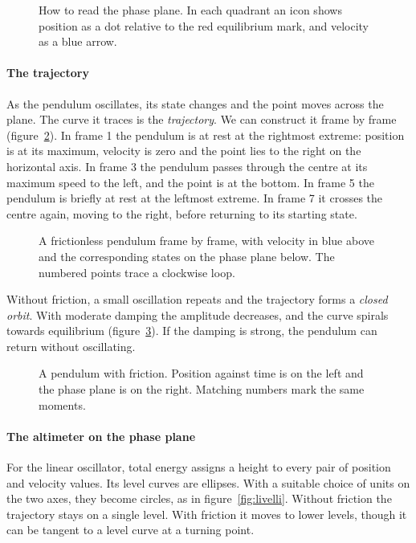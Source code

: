 \begin{figure}
\caption{How to read the phase plane. In each quadrant an icon shows position as a dot relative to the red equilibrium mark, and velocity as a blue arrow.}
\label{fig:leggere}
\end{figure}

\paragraph{The trajectory} As the pendulum oscillates, its state changes and the point moves across the plane. The curve it traces is the \emph{trajectory}. We can construct it frame by frame (figure~\ref{fig:fotogrammi}). In frame 1 the pendulum is at rest at the rightmost extreme: position is at its maximum, velocity is zero and the point lies to the right on the horizontal axis. In frame 3 the pendulum passes through the centre at its maximum speed to the left, and the point is at the bottom. In frame 5 the pendulum is briefly at rest at the leftmost extreme. In frame 7 it crosses the centre again, moving to the right, before returning to its starting state.

\begin{figure}
\caption{A frictionless pendulum frame by frame, with velocity in blue above and the corresponding states on the phase plane below. The numbered points trace a clockwise loop.}
\label{fig:fotogrammi}
\end{figure}

Without friction, a small oscillation repeats and the trajectory forms a \emph{closed orbit}. With moderate damping the amplitude decreases, and the curve spirals towards equilibrium (figure~\ref{fig:spiralefot}). If the damping is strong, the pendulum can return without oscillating.

\begin{figure}
\caption{A pendulum with friction. Position against time is on the left and the phase plane is on the right. Matching numbers mark the same moments.}
\label{fig:spiralefot}
\end{figure}

\paragraph{The altimeter on the phase plane} For the linear oscillator, total energy assigns a height to every pair of position and velocity values. Its level curves are ellipses. With a suitable choice of units on the two axes, they become circles, as in figure~\ref{fig:livelli}. Without friction the trajectory stays on a single level. With friction it moves to lower levels, though it can be tangent to a level curve at a turning point.

